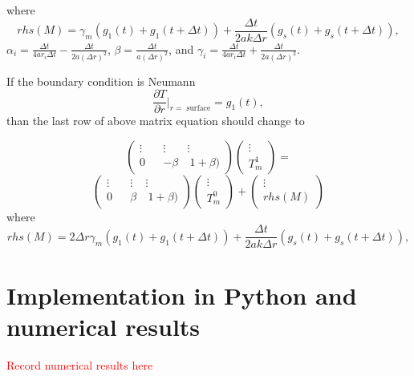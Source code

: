 \documentclass[12pt]{article}
\begin{document}
where \begin{equation}rhs(M)=
\gamma_m(g_1(t)+g_1(t+\Delta t))+\frac{\Delta t}{2ak\Delta r}(g_s(t)+g_s(t+\Delta t)),\nonumber\end{equation}
$\alpha_i = \frac{\Delta t}{4ar_i\Delta t}-\frac{\Delta t}{2a(\Delta r)^2}$, $\beta = \frac{\Delta t}{a(\Delta r)^2}$, and $\gamma_i = \frac{\Delta t}{4ar_i\Delta t}+\frac{\Delta t}{2a(\Delta r)^2}$. %

If the boundary condition is Neumann $$\frac{\partial T}{\partial r}\bigg|_{r=\text{ surface}} = g_1(t),$$ than the last row of above matrix equation should change to 

\begin{equation}
\begin{pmatrix}
\vdots & & \vdots & \vdots\\
0 & & -\beta &\ 1+\beta)\end{pmatrix}\begin{pmatrix}\vdots\\
T^1_m\end{pmatrix}= \end{equation}
\begin{equation}
\begin{pmatrix}
\vdots & & \vdots & \vdots\\
0 & & \beta &\ 1+\beta)\end{pmatrix}\begin{pmatrix}\vdots\\T^0_m\end{pmatrix} +
\begin{pmatrix}\vdots\\
 rhs(M)\end{pmatrix}\end{equation}
where \begin{equation}rhs(M)=
2\Delta r\gamma_m(g_1(t)+g_1(t+\Delta t))+\frac{\Delta t}{2ak\Delta r}(g_s(t)+g_s(t+\Delta t)),\nonumber\end{equation}

\section{Implementation in Python and numerical results}
\textcolor{red}{Record numerical results here}
\end{document}
